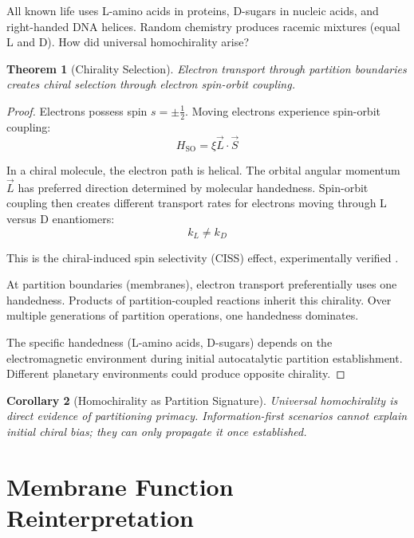 \documentclass[twocolumn,10pt,a4paper]{article}
\newtheorem{theorem}{Theorem}[section]
\newtheorem{corollary}[theorem]{Corollary}
\theoremstyle{definition}
\theoremstyle{remark}
\begin{document}
All known life uses L-amino acids in proteins, D-sugars in nucleic acids, and right-handed DNA helices. Random chemistry produces racemic mixtures (equal L and D). How did universal homochirality arise?

\begin{theorem}[Chirality Selection]
\label{thm:chirality}
Electron transport through partition boundaries creates chiral selection through electron spin-orbit coupling.
\end{theorem}

\begin{proof}
Electrons possess spin $s = \pm\frac{1}{2}$. Moving electrons experience spin-orbit coupling:
\begin{equation}
    H_{\text{SO}} = \xi \vec{L} \cdot \vec{S}
\end{equation}

In a chiral molecule, the electron path is helical. The orbital angular momentum $\vec{L}$ has preferred direction determined by molecular handedness. Spin-orbit coupling then creates different transport rates for electrons moving through L versus D enantiomers:
\begin{equation}
    k_L \neq k_D
\end{equation}

This is the chiral-induced spin selectivity (CISS) effect, experimentally verified \cite{naaman2012}.

At partition boundaries (membranes), electron transport preferentially uses one handedness. Products of partition-coupled reactions inherit this chirality. Over multiple generations of partition operations, one handedness dominates.

The specific handedness (L-amino acids, D-sugars) depends on the electromagnetic environment during initial autocatalytic partition establishment. Different planetary environments could produce opposite chirality.
\end{proof}

\begin{corollary}[Homochirality as Partition Signature]
\label{cor:homochirality}
Universal homochirality is direct evidence of partitioning primacy. Information-first scenarios cannot explain initial chiral bias; they can only propagate it once established.
\end{corollary}

\section{Membrane Function Reinterpretation}
\label{sec:membranes}
\end{document}
